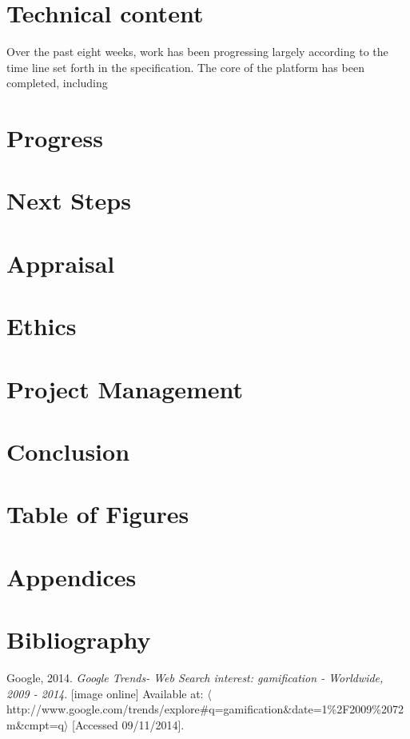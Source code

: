 \documentclass[10pt,a4paper]{report}
\begin{document}
\section*{Technical content}
Over the past eight weeks, work has been progressing largely according to the time line set forth in the specification. The core of the platform has been completed, including 
\section*{Progress}
\section*{Next Steps}
\section*{Appraisal}
\section*{Ethics}
\section*{Project Management}
\section*{Conclusion}
\section*{Table of Figures}
\listoffigures
\section*{Appendices}
\section*{Bibliography}
Google, 2014. \textit{Google Trends- Web Search interest: gamification - Worldwide, 2009 - 2014}. [image online] Available at: $\langle$http://www.google.com/trends/explore\#q=gamification\&date=1\%2F2009\%2072m\&cmpt=q$\rangle$ [Accessed 09/11/2014].
\end{document}
